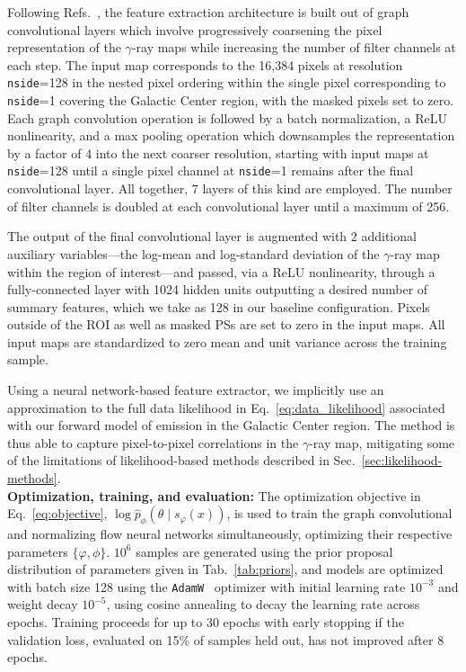 \documentclass[prd,aps,10pt,nofootinbib,twocolumn,superscriptaddress,preprintnumbers,balancelastpage,longbibliography]{revtex4-1}
\begin{document}
Following Refs.~\cite{Perraudin:2018rbt,List:2020mzd}, the feature extraction architecture is built out of graph convolutional layers which involve progressively coarsening the pixel representation of the $\gamma$-ray maps while increasing the number of filter channels at each step. The input map corresponds to the 16,384 pixels at \HEALPix resolution \texttt{nside}=128 in the nested pixel ordering within the single pixel corresponding to \texttt{nside}=1 covering the Galactic Center region, with the masked pixels set to zero. Each graph convolution operation is followed by a batch normalization, a ReLU nonlinearity, and a max pooling operation which downsamples the representation by a factor of 4 into the next coarser \HEALPix resolution, starting with input maps at \texttt{nside}=128 until a single pixel channel at \texttt{nside}=1 remains after the final convolutional layer. All together, 7 layers of this kind are employed. The number of filter channels is doubled at each convolutional layer until a maximum of 256. 

The output of the final convolutional layer is augmented with 2 additional auxiliary variables---the log-mean and log-standard deviation of the $\gamma$-ray map within the region of interest---and passed, via a ReLU nonlinearity, through a fully-connected layer with 1024 hidden units outputting a desired number of summary features, which we take as 128 in our baseline configuration. Pixels outside of the ROI as well as masked PSs are set to zero in the input maps. All input maps are standardized to zero mean and unit variance across the training sample.

Using a neural network-based feature extractor, we implicitly use an approximation to the full data likelihood in Eq.~\eqref{eq:data_likelihood} associated with our forward model of emission in the Galactic Center region. The method is thus able to capture pixel-to-pixel correlations in the $\gamma$-ray map, mitigating some of the limitations of likelihood-based methods described in Sec.~\ref{sec:likelihood-methods}. \\

\noindent
\textbf{Optimization, training, and evaluation:} The optimization objective in Eq.~\eqref{eq:objective}, $\log \hat{p}_\phi(\theta\mid s_\varphi(x))$, is used to train the graph convolutional and normalizing flow neural networks simultaneously, optimizing their respective parameters $\{\varphi, \phi\}$. $10^{6}$ samples are generated using the prior proposal distribution of parameters given in Tab.~\ref{tab:priors}, and models are optimized with batch size 128 using the \texttt{AdamW}~\cite{KingmaB14,loshchilov2018decoupled} optimizer with initial learning rate $10^{-3}$ and weight decay $10^{-5}$, using cosine annealing to decay the learning rate across epochs. Training proceeds for up to 30 epochs with early stopping if the validation loss, evaluated on 15\% of samples held out, has not improved after 8 epochs. 
\end{document}
